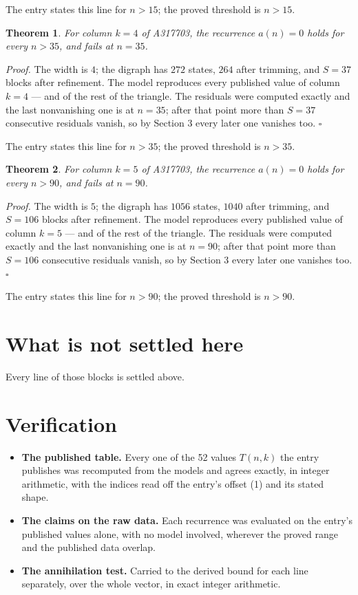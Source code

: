 \documentclass[11pt]{article}
\newtheorem{theorem}{Theorem}
\theoremstyle{definition}
\begin{document}
The entry states this line for $n > 15$; the proved threshold is $n > 15$.

\begin{theorem} For column $k = 4$ of A317703, the recurrence $a(n) = 0$ holds for every $n > 35$, and fails at $n = 35$.\end{theorem}

{\itshape Proof.} The width is $4$; the digraph has $272$ states, $264$ after trimming, and $S = 37$ blocks after refinement. The model reproduces every published value of column $k = 4$ --- and of the rest of the triangle. The residuals were computed exactly and the last nonvanishing one is at $n = 35$; after that point more than $S = 37$ consecutive residuals vanish, so by Section 3 every later one vanishes too. $\square$

The entry states this line for $n > 35$; the proved threshold is $n > 35$.

\begin{theorem} For column $k = 5$ of A317703, the recurrence $a(n) = 0$ holds for every $n > 90$, and fails at $n = 90$.\end{theorem}

{\itshape Proof.} The width is $5$; the digraph has $1056$ states, $1040$ after trimming, and $S = 106$ blocks after refinement. The model reproduces every published value of column $k = 5$ --- and of the rest of the triangle. The residuals were computed exactly and the last nonvanishing one is at $n = 90$; after that point more than $S = 106$ consecutive residuals vanish, so by Section 3 every later one vanishes too. $\square$

The entry states this line for $n > 90$; the proved threshold is $n > 90$.

\section{What is not settled here}

Every line of those blocks is settled above.

\section{Verification}

\begin{itemize}

\item {\bfseries The published table.} Every one of the 52 values $T(n,k)$ the entry publishes was recomputed from the models and agrees exactly, in integer arithmetic, with the indices read off the entry's offset (1) and its stated shape.

\item {\bfseries The claims on the raw data.} Each recurrence was evaluated on the entry's published values alone, with no model involved, wherever the proved range and the published data overlap.

\item {\bfseries The annihilation test.} Carried to the derived bound for each line separately, over the whole vector, in exact integer arithmetic.

\end{itemize}
\end{document}

